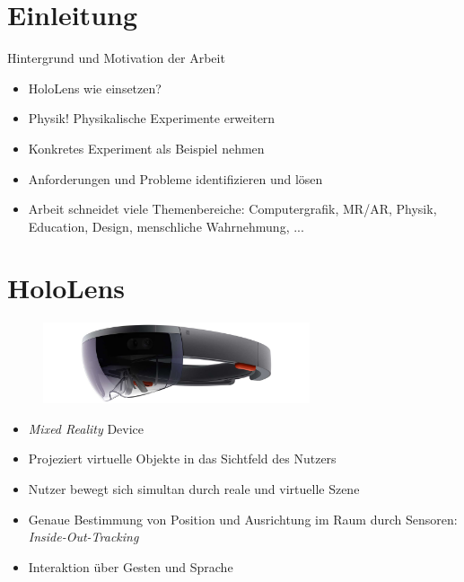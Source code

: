 \part{Einleitung}
\label{part:intro}

\begin{frame}[fragile]{Hintergrund und Motivation der Arbeit}
\begin{itemize}
	\item HoloLens wie einsetzen?
	\pause
	\item Physik! Physikalische Experimente erweitern
	\pause
	\item Konkretes Experiment als Beispiel nehmen
	\item Anforderungen und Probleme identifizieren und lösen
	\pause
	\item Arbeit schneidet viele Themenbereiche: Computergrafik, MR/AR, Physik, Education, Design, menschliche Wahrnehmung, ... 
\end{itemize}
 
\end{frame}

\part{HoloLens}
\label{part:hololens}
\begin{frame}[fragile]{}
\begin{figure}[h!]
	\centering
	\includegraphics[width=0.7\textwidth]{images/papers/hololens.jpg}
\end{figure}
\begin{itemize}
	\pause
	\item \textit{Mixed Reality} Device
	\pause
	\item Projeziert virtuelle Objekte in das Sichtfeld des Nutzers
	\pause
	\item Nutzer bewegt sich simultan durch reale und virtuelle Szene
	\pause
	\item Genaue Bestimmung von Position und Ausrichtung im Raum durch Sensoren: \textit{Inside-Out-Tracking}
	\pause
	\item Interaktion über Gesten und Sprache
\end{itemize}	
\end{frame}

